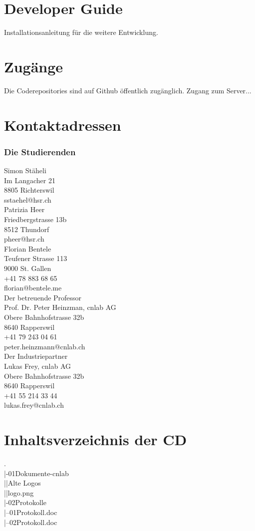 \section{Developer Guide}
Installationsanleitung für die weitere Entwicklung.


\section{Zugänge}
Die Coderepositories sind auf Github öffentlich zugänglich. Zugang zum Server... 

\section{Kontaktadressen}
\subsubsection{Die Studierenden}

Simon Stäheli\\
Im Langacher 21\\
8805 Richterswil\\
sstaehel@hsr.ch\\

Patrizia Heer\\
Friedbergstrasse 13b\\
8512 Thundorf\\
pheer@hsr.ch\\

Florian Bentele\\
Teufener Strasse 113\\
9000 St. Gallen\\
+41 78 883 68 65\\
florian@bentele.me\\

Der betreuende Professor\\
Prof. Dr. Peter Heinzman, cnlab AG\\
Obere Bahnhofstrasse 32b\\
8640 Rapperswil\\
+41 79 243 04 61\\
peter.heinzmann@cnlab.ch\\

Der Industriepartner\\
Lukas Frey, cnlab AG\\
Obere Bahnhofstrasse 32b\\
8640 Rapperswil\\
+41 55 214 33 44\\
lukas.frey@cnlab.ch

\section{Inhaltsverzeichnis der CD}
.\\
|-01Dokumente-cnlab\\
||Alte Logos\\
||logo.png\\
|-02Protokolle\\
|--01Protokoll.doc\\
|--02Protokoll.doc\\


